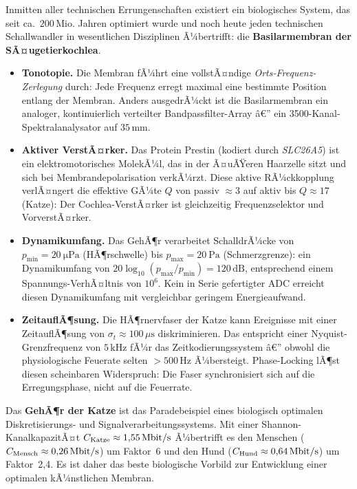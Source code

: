 ﻿\documentclass[12pt,a4paper,titlepage]{report}
\begin{document}
Inmitten aller technischen Errungenschaften existiert ein biologisches System,
das seit ca.\ $200\,\mathrm{Mio.}$ Jahren optimiert wurde und noch heute
jeden technischen Schallwandler in wesentlichen Disziplinen Ã¼bertrifft:
die \textbf{Basilarmembran der SÃ¤ugetierkochlea}.

\begin{itemize}[leftmargin=2em]
	\item \textbf{Tonotopie.}
		Die Membran fÃ¼hrt eine vollstÃ¤ndige \emph{Orts-Frequenz-Zerlegung}
		durch: Jede Frequenz erregt maximal eine bestimmte Position
		entlang der Membran.
		Anders ausgedrÃ¼ckt ist die Basilarmembran ein analoger,
		kontinuierlich verteilter Bandpassfilter-Array â€”
		ein 3500-Kanal-Spektralanalysator auf $35\,\mathrm{mm}$.
	\item \textbf{Aktiver VerstÃ¤rker.}
		Das Protein Prestin (kodiert durch \textit{SLC26A5}) ist ein
		elektromotorisches MolekÃ¼l, das in der Ã¤uÃŸeren Haarzelle sitzt
		und sich bei Membrandepolarisation verkÃ¼rzt.
		Diese aktive RÃ¼ckkopplung verlÃ¤ngert die effektive GÃ¼te $Q$
		von passiv $\approx 3$ auf aktiv bis $Q\approx17$ (Katze):
		Der Cochlea-VerstÃ¤rker ist gleichzeitig
		Frequenzselektor und VorverstÃ¤rker.
	\item \textbf{Dynamikumfang.}
		Das GehÃ¶r verarbeitet SchalldrÃ¼cke von
		$p_{\min}=\SI{20}{\micro\pascal}$ (HÃ¶rschwelle) bis
		$p_{\max}=\SI{20}{\pascal}$ (Schmerzgrenze):
		ein Dynamikumfang von
		$20\log_{10}(p_{\max}/p_{\min}) = 120\,\mathrm{dB}$,
		entsprechend einem Spannungs-VerhÃ¤ltnis von $10^6$.
		Kein in Serie gefertigter ADC erreicht diesen Dynamikumfang
		mit vergleichbar geringem Energieaufwand.
	\item \textbf{ZeitauflÃ¶sung.}
		Die HÃ¶rnervfaser der Katze kann Ereignisse mit einer
		ZeitauflÃ¶sung von $\sigma_t \approx 100\,\mu\mathrm{s}$
		diskriminieren.
		Das entspricht einer Nyquist-Grenzfrequenz von $5\,\mathrm{kHz}$
		fÃ¼r das Zeitkodierungssystem â€” obwohl die physiologische
		Feuerate selten $> 500\,\mathrm{Hz}$ Ã¼bersteigt.
		Phase-Locking lÃ¶st diesen scheinbaren Widerspruch:
		Die Faser synchronisiert sich auf die Erregungsphase,
		nicht auf die Feuerrate.
\end{itemize}

Das \textbf{GehÃ¶r der Katze} ist das Paradebeispiel eines
biologisch optimalen Diskretisierungs- und Signalverarbeitungssystems.
Mit einer Shannon-KanalkapazitÃ¤t $C_{\rm Katze}\approx1{,}55\,\mathrm{Mbit / s}$
Ã¼bertrifft es den Menschen ($C_{\rm Mensch}\approx0{,}26\,\mathrm{Mbit/s}$)
um Faktor~6 und den Hund ($C_{\rm Hund}\approx0{,}64\,\mathrm{Mbit/s}$)
um Faktor~2{,}4.
Es ist daher das beste biologische Vorbild zur Entwicklung
einer optimalen kÃ¼nstlichen Membran.
\end{document}
